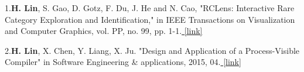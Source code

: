 

1.{\textbf{H. Lin}, S. Gao, D. Gotz, F. Du, J. He and N. Cao, "RCLens: Interactive Rare Category Exploration and Identification," in IEEE Transactions on Visualization and Computer Graphics, vol. PP, no. 99, pp. 1-1.}\href{http://ieeexplore.ieee.org/stamp/stamp.jsp?tp=\&arnumber=7939996\&isnumber=4359476}{ [link]}

2.{\textbf{H. Lin}, X. Chen, Y. Liang, X. Ju. "Design and Application of a Process-Visible Compiler" in Software Engineering \& applications, 2015, 04.}\href{http://www.atlantis-press.com/php/pub.php?publication=cetcu-15&frame=http\%3A//www.atlantis-press.com/php/paper-details.php\%3Fid\%3D25846823}{ [link]}

